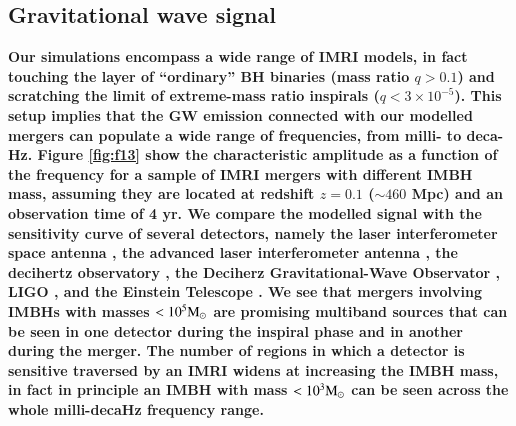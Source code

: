 \documentclass[article]{aa}
\newcommand{\Ms}{{\rm M}_\odot}
\begin{document}
\subsection{Gravitational wave signal}
{\bf
Our simulations encompass a wide range of IMRI models, in fact touching the layer of ``ordinary'' BH binaries (mass ratio $q>0.1$) and 
scratching the limit of extreme-mass ratio inspirals ($q < 3 \times10^{-5}$). This setup implies that the GW emission connected with our modelled mergers can populate a wide range of frequencies, from milli- to deca-Hz. Figure \ref{fig:f13} show the characteristic amplitude \citep{kocsis12,ASLiK18,seoane18,robson19} as a function of the frequency for a sample of IMRI mergers with different IMBH mass, assuming they are located at redshift $z=0.1$ ($\sim 460$ Mpc) and an observation time of 4 yr. We compare the modelled signal with the sensitivity curve of several detectors, namely the laser interferometer space antenna \citep[LISA,][]{eLISA13,amaro17lisa}, the advanced laser interferometer antenna \citep[ALIA,][]{bender13}, the decihertz observatory \citep[DO,]{arca19}, the Deciherz Gravitational-Wave Observator \citep[DECIGO,]{Kawamura11}, LIGO \citep{abbott16}, and the Einstein Telescope \citep[ET]{punturo10}. We see that mergers involving IMBHs with masses $< 10^5\Ms$ are promising multiband sources that can be seen in one detector during the inspiral phase and in another during the merger. The number of regions in which a detector is sensitive traversed by an IMRI widens at increasing the IMBH mass, in fact in principle an IMBH with mass $<10^3\Ms$ can be seen across the whole milli-decaHz frequency range.  

}
\end{document}

